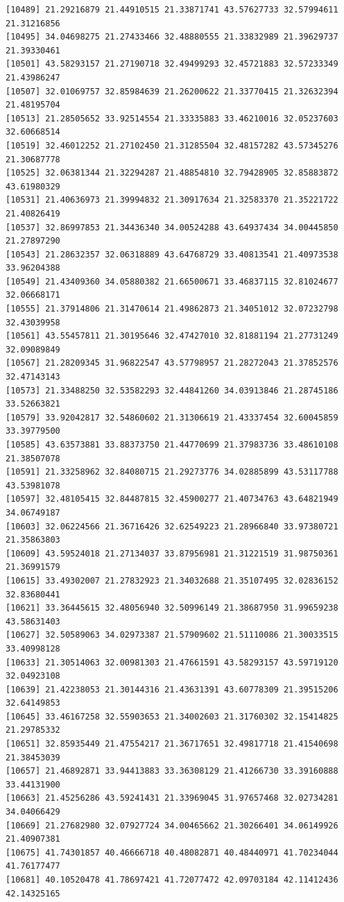 \documentclass[
  letterpaper,
  DIV=11,
  numbers=noendperiod]{scrartcl}
\begin{document}
\begin{verbatim}
[10489] 21.29216879 21.44910515 21.33871741 43.57627733 32.57994611 21.31216856
[10495] 34.04698275 21.27433466 32.48880555 21.33832989 21.39629737 21.39330461
[10501] 43.58293157 21.27190718 32.49499293 32.45721883 32.57233349 21.43986247
[10507] 32.01069757 32.85984639 21.26200622 21.33770415 21.32632394 21.48195704
[10513] 21.28505652 33.92514554 21.33335883 33.46210016 32.05237603 32.60668514
[10519] 32.46012252 21.27102450 21.31285504 32.48157282 43.57345276 21.30687778
[10525] 32.06381344 21.32294287 21.48854810 32.79428905 32.85883872 43.61980329
[10531] 21.40636973 21.39994832 21.30917634 21.32583370 21.35221722 21.40826419
[10537] 32.86997853 21.34436340 34.00524288 43.64937434 34.00445850 21.27897290
[10543] 21.28632357 32.06318889 43.64768729 33.40813541 21.40973538 33.96204388
[10549] 21.43409360 34.05880382 21.66500671 33.46837115 32.81024677 32.06668171
[10555] 21.37914806 21.31470614 21.49862873 21.34051012 32.07232798 32.43039958
[10561] 43.55457811 21.30195646 32.47427010 32.81881194 21.27731249 32.09089849
[10567] 21.28209345 31.96822547 43.57798957 21.28272043 21.37852576 32.47143143
[10573] 21.33488250 32.53582293 32.44841260 34.03913846 21.28745186 33.52663821
[10579] 33.92042817 32.54860602 21.31306619 21.43337454 32.60045859 33.39779500
[10585] 43.63573881 33.88373750 21.44770699 21.37983736 33.48610108 21.38507078
[10591] 21.33258962 32.84080715 21.29273776 34.02885899 43.53117788 43.53981078
[10597] 32.48105415 32.84487815 32.45900277 21.40734763 43.64821949 34.06749187
[10603] 32.06224566 21.36716426 32.62549223 21.28966840 33.97380721 21.35863803
[10609] 43.59524018 21.27134037 33.87956981 21.31221519 31.98750361 21.36991579
[10615] 33.49302007 21.27832923 21.34032688 21.35107495 32.02836152 32.83680441
[10621] 33.36445615 32.48056940 32.50996149 21.38687950 31.99659238 43.58631403
[10627] 32.50589063 34.02973387 21.57909602 21.51110086 21.30033515 33.40998128
[10633] 21.30514063 32.00981303 21.47661591 43.58293157 43.59719120 32.04923108
[10639] 21.42238053 21.30144316 21.43631391 43.60778309 21.39515206 32.64149853
[10645] 33.46167258 32.55903653 21.34002603 21.31760302 32.15414825 21.29785332
[10651] 32.85935449 21.47554217 21.36717651 32.49817718 21.41540698 21.38453039
[10657] 21.46892871 33.94413883 33.36308129 21.41266730 33.39160888 33.44131900
[10663] 21.45256286 43.59241431 21.33969045 31.97657468 32.02734281 34.04066429
[10669] 21.27682980 32.07927724 34.00465662 21.30266401 34.06149926 21.40907381
[10675] 41.74301857 40.46666718 40.48082871 40.48440971 41.70234044 41.76177477
[10681] 40.10520478 41.78697421 41.72077472 42.09703184 42.11412436 42.14325165

\end{verbatim}
\end{document}
